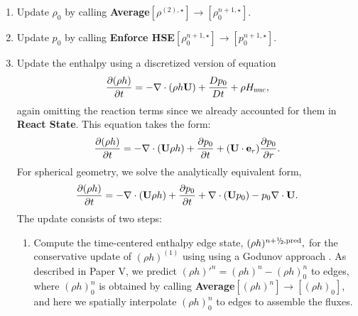 \begin{description}
\begin{enumerate}
\begin{enumerate}
\end{enumerate}

\item Update $\rho_0$ by calling {\bf Average}$[\rho^{(2),\star}]\rightarrow[\rho_0^{n+1,\star}]$.

\item Update $p_0$ by calling {\bf Enforce HSE}$[\rho_0^{n+1,\star}] \rightarrow [p_0^{n+1,\star}]$.

\item Update the enthalpy using a discretized version of equation
%
\begin{equation}
\frac{\partial(\rho h)}{\partial t} = -\nabla\cdot(\rho h\Ub) + \frac{Dp_0}{Dt} + \rho\Hnuc,
\end{equation}
%
again omitting the reaction terms since we already accounted for
them in {\bf React State}.  This equation takes the form:
\begin{equation}
\frac{\partial (\rho h)}{\partial t}  = - \nabla \cdot (\Ub \rho h) + \frac{\partial p_0}{\partial t} + (\Ub \cdot \eb_r) \frac{\partial p_0}{\partial r}.
\end{equation}
For spherical geometry, we solve the analytically equivalent form,
\begin{equation}
\frac{\partial (\rho h)}{\partial t}  = - \nabla \cdot (\Ub \rho h) + \frac{\partial p_0}{\partial t} + \nabla \cdot (\Ub p_0) - p_0 \nabla \cdot \Ub.
\end{equation}
The update consists of two steps:

\begin{enumerate}
\renewcommand{\labelenumii}{{\bf \roman{enumii}}.}

\item Compute the time-centered enthalpy edge state, $(\rho h)^{\nph,\pred},$
  for the conservative update of $(\rho h)^{(1)}$ using using a Godunov approach \citep{XRB_III}.
  As described in Paper V, we predict $(\rho h)'^n=(\rho h)^n-(\rho h)_0^n$ to edges,
  where $(\rho h)_0^n$ is obtained by calling {\bf Average}$[(\rho h)^n]\rightarrow[(\rho h)_0]$,
  and here we spatially interpolate $(\rho h)_0^n$ to edges to assemble the fluxes.


\end{enumerate}
\end{enumerate}
\end{description}

